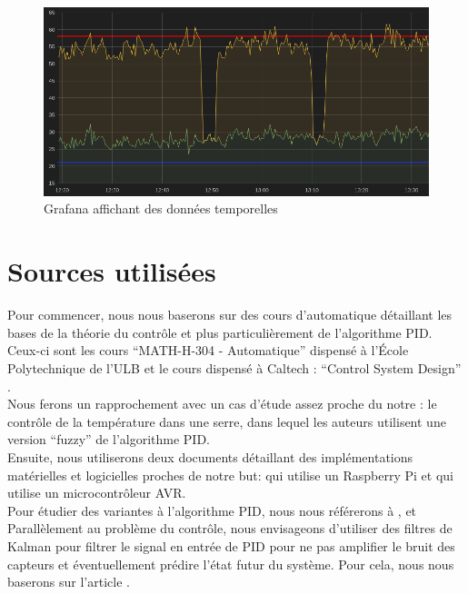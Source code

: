 \documentclass[a4paper,10pt]{article}
\begin{document}
\thispagestyle{empty}
\begin{figure}[H]
\centering
\includegraphics[width=\textwidth]{figures/Grafana.png}
\caption{Grafana affichant des données temporelles}
\label{grafana}
\end{figure}

\section{Sources utilisées}

Pour commencer, nous nous baserons sur des cours d'automatique détaillant les bases de la théorie du contrôle et plus particulièrement de l'algorithme PID. Ceux-ci sont les cours ``MATH-H-304 - Automatique'' \cite{Kinnaert2013} dispensé à l'École Polytechnique de l'ULB et le cours dispensé à Caltech : ``Control System Design'' \cite{Knospe2006}. \\

Nous ferons un rapprochement avec un cas d'étude assez proche du notre : le contrôle de la température dans une serre,  \cite{Zheying2014} dans lequel les auteurs utilisent une version ``fuzzy'' de l'algorithme PID.\\

Ensuite, nous utiliserons deux documents détaillant des implémentations matérielles et logicielles proches de notre but:  \cite{Ioannidis2014} qui utilise un Raspberry Pi et  \cite{ATMEL2005} qui utilise un microcontrôleur AVR. \\

Pour étudier des variantes à l'algorithme PID, nous nous référerons à  \cite{Afou2014},  \cite{ballard1993pid} et  \cite{Saletovi2014} \\

Parallèlement au problème du contrôle, nous envisageons d'utiliser des filtres de Kalman pour filtrer le signal en entrée de PID pour ne pas amplifier le bruit des capteurs et éventuellement prédire l'état futur du système. Pour cela, nous nous baserons sur l'article  \cite{Welch2006}.

\newpage

\printbibliography
\end{document}
